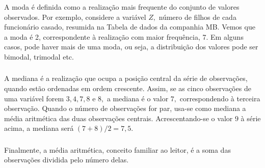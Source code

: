 \documentclass[14pt,aspectratio=1610]{beamer}
\begin{document}
\begin{frame}{}
\frametitle{}
\begin{block}{}
\justifying
A moda é definida como a realização mais frequente do conjunto de valores observados. Por exemplo, considere a variável $Z,$ número de filhos de cada funcionário 
casado, resumida na Tabela de dados da companhia MB. Vemos que a moda é 2, correspondente à realização com maior frequência, 7. Em alguns casos, pode haver 
mais de uma moda, ou seja, a distribuição dos valores pode ser bimodal, trimodal etc.
\end{block}
\end{frame}

\begin{frame}{}
\frametitle{}
\begin{block}{}
\justifying
A mediana é a realização que ocupa a posição central da série de observações, quando
estão ordenadas em ordem crescente. Assim, se as cinco observações de uma variável forem $3, 4, 7, 8$ e $8,$ a mediana é o valor $7,$ correspondendo à terceira 
observação. Quando o número de observações for par, usa-se como mediana a média aritmética das duas observações centrais. Acrescentando-se o valor $9$ à série acima, a mediana será $(7 + 8)/2 = 7,5.$
\end{block}
\end{frame}

\begin{frame}{}
\frametitle{}
\begin{block}{}
\justifying
Finalmente, a média aritmética, conceito familiar ao leitor, é a soma das observações dividida pelo número delas.
\end{block}
\end{frame}

\end{document}
